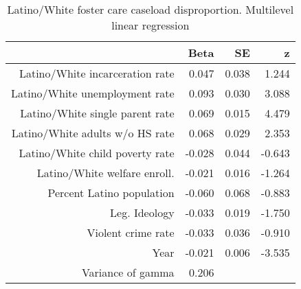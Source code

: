 \begin{table}[ht]
\centering
\caption{Latino/White foster care caseload disproportion. Multilevel linear regression} 
\label{l.c.tab}
\begin{tabular}{rrrr}
  \hline
 & Beta & SE & z \\ 
  \hline
Latino/White incarceration rate & 0.047 & 0.038 & 1.244 \\ 
  Latino/White unemployment rate & 0.093 & 0.030 & 3.088 \\ 
  Latino/White single parent rate & 0.069 & 0.015 & 4.479 \\ 
  Latino/White adults w/o HS rate & 0.068 & 0.029 & 2.353 \\ 
  Latino/White child poverty rate & -0.028 & 0.044 & -0.643 \\ 
  Latino/White welfare enroll.  & -0.021 & 0.016 & -1.264 \\ 
  Percent Latino population & -0.060 & 0.068 & -0.883 \\ 
  Leg. Ideology & -0.033 & 0.019 & -1.750 \\ 
  Violent crime rate & -0.033 & 0.036 & -0.910 \\ 
  Year & -0.021 & 0.006 & -3.535 \\ 
  Variance of gamma & 0.206 &  &  \\ 
   \hline
\end{tabular}
\end{table}
